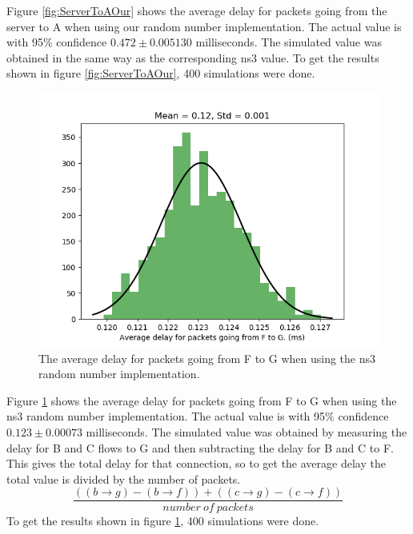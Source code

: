 \documentclass{article}
\begin{document}
Figure \ref{fig:ServerToAOur} shows the average delay for packets going from the server to A when using our random number implementation.
The actual value is with 95\% confidence $0.472 \pm 0.005130$ milliseconds.
The simulated value was obtained in the same way as the corresponding ns3 value.
To get the results shown in figure \ref{fig:ServerToAOur}, 400 simulations were done.


\begin{figure}[!htbp]
    \centering
    \includegraphics[width=0.85\linewidth]{ns3_fg_delay.png}
    \caption{The average delay for packets going from F to G when using the ns3 random number implementation.}
    \label{fig:FGNs3}
\end{figure}

Figure \ref{fig:FGNs3} shows the average delay for packets going from F to G when using the ns3 random number implementation.
The actual value is with 95\% confidence $0.123 \pm 0.00073$ milliseconds.
The simulated value was obtained by measuring the delay for B and C flows to G and then subtracting the delay for B and C to F.
This gives the total delay for that connection, so to get the average delay the total value is divided by the number of packets.
$$\frac{((b \rightarrow g) - (b \rightarrow f)) + ((c \rightarrow g) - (c \rightarrow f))}{number\ of\ packets}$$
To get the results shown in figure \ref{fig:FGNs3}, 400 simulations were done.
\end{document}
